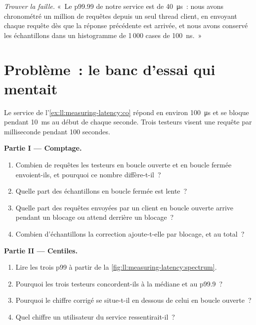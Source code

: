 \begin{exercise}[$\star\star\star$]\label{exo:ll:measuring-latency:8}
\emph{Trouver la faille.} «~Le p99.99 de notre service est de \qty{40}{\micro\second}~: nous avons chronométré un million de requêtes depuis un seul
thread client, en envoyant chaque requête dès que la réponse précédente est arrivée, et nous avons conservé les échantillons dans un histogramme de 1\,000
cases de \qty{100}{\nano\second}.~»
\end{exercise}

\section{Problème~: le banc d'essai qui mentait}

\begin{problem}\label{pb:ll:measuring-latency:1}
Le service de l'\cref{ex:ll:measuring-latency:co} répond en environ \qty{100}{\micro\second} et se bloque pendant
\qty{10}{\milli\second} au début de chaque seconde. Trois testeurs visent une requête par milliseconde pendant 100 secondes.

\medskip\noindent\textbf{Partie I --- Comptage.}
\begin{enumerate}
\item Combien de requêtes les testeurs en boucle ouverte et en boucle fermée envoient-ils, et pourquoi ce nombre diffère-t-il~?
\item Quelle part des échantillons en boucle fermée est lente~?
\item Quelle part des requêtes envoyées par un client en boucle ouverte arrive pendant un blocage ou attend derrière un blocage~?
\item Combien d'échantillons la correction ajoute-t-elle par blocage, et au total~?
\end{enumerate}

\medskip\noindent\textbf{Partie II --- Centiles.}
\begin{enumerate}[resume]
\item Lire les trois p99 à partir de la \cref{fig:ll:measuring-latency:spectrum}.
\item Pourquoi les trois testeurs concordent-ils à la médiane et au p99.9~?
\item Pourquoi le chiffre corrigé se situe-t-il en dessous de celui en boucle ouverte~?
\item Quel chiffre un utilisateur du service ressentirait-il~?
\end{enumerate}


\end{problem}
